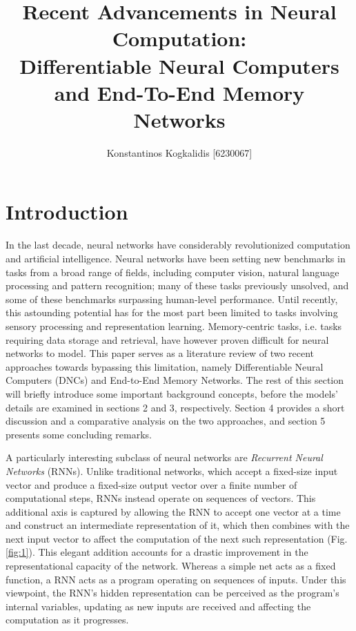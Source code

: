 \documentclass[]{article}
\begin{document}
\author{Konstantinos Kogkalidis [6230067]}
\title{Recent Advancements in Neural Computation: \\
\large Differentiable Neural Computers and End-To-End Memory Networks}
\maketitle

\section{Introduction}
In the last decade, neural networks have considerably revolutionized computation and artificial intelligence. Neural networks have been setting new benchmarks in tasks from a broad range of fields, including computer vision, natural language processing and pattern recognition; many of these tasks previously unsolved, and some of these benchmarks surpassing human-level performance. Until recently, this astounding potential has for the most part been limited to tasks involving sensory processing and representation learning. Memory-centric tasks, i.e. tasks requiring data storage and retrieval, have however proven difficult for neural networks to model. This paper serves as a literature review of two recent approaches towards bypassing this limitation, namely Differentiable Neural Computers (DNCs) and End-to-End Memory Networks. The rest of this section will briefly introduce some important background concepts, before the models' details are examined in sections 2 and 3, respectively. Section 4 provides a short discussion and a comparative analysis on the two approaches, and section 5 presents some concluding remarks.

A particularly interesting subclass of neural networks are \textit{Recurrent Neural Networks} (RNNs). Unlike traditional networks, which accept a fixed-size input vector and produce a fixed-size output vector over a finite number of computational steps, RNNs instead operate on sequences of vectors. This additional axis is captured by allowing the RNN to accept one vector at a time and construct an intermediate representation of it, which then combines with the next input vector to affect the computation of the next such representation (Fig.\ref{fig:1}). This elegant addition accounts for a drastic improvement in the representational capacity of the network. Whereas a simple net acts as a fixed function, a RNN acts as a program operating on sequences of inputs. Under this viewpoint, the RNN's hidden representation can be perceived as the program's internal variables, updating as new inputs are received and affecting the computation as it progresses.
\end{document}

